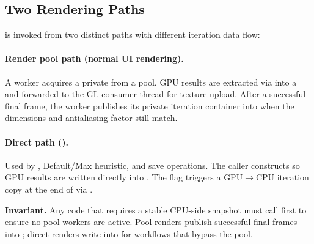 \subsection{Two Rendering Paths}
\label{subsec:two-render-paths}

 is invoked from two distinct paths with different iteration
data flow:

\paragraph{Render pool path (normal UI rendering).}
A worker acquires a private  from a pool.  GPU
results are extracted via  into a  and
forwarded to the GL consumer thread for texture upload.  After a successful
final frame, the worker publishes its private iteration container into
 when the dimensions and antialiasing factor still match.

\paragraph{Direct path ().}
Used by ,  Default/Max heuristic, and save
operations.  The caller constructs
 so GPU results are written directly
into .  The  flag triggers a
GPU\(\to\)CPU iteration copy at the end of  via
.

\textbf{Invariant.}  Any code that requires a stable CPU-side
 snapshot must call  first
to ensure no pool workers are active.  Pool renders publish successful final
frames into ; direct renders write into 
for workflows that bypass the pool.

